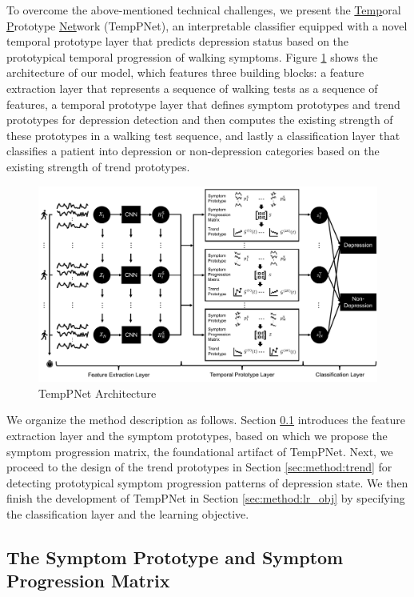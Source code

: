 \documentclass[mnsc]{informs3b} %
\begin{document}
To overcome the above-mentioned technical challenges, we present the \underline{Temp}oral \underline{P}rototype \underline{Net}work (TempPNet), an interpretable classifier equipped with a novel temporal prototype layer that predicts depression status based on the prototypical temporal progression of walking symptoms. 
Figure \ref{fig:main_model} shows the architecture of our model, which features three building blocks: a feature extraction layer that represents a sequence of walking tests as a sequence of features, a temporal prototype layer that defines symptom prototypes and trend prototypes for depression detection and then computes the existing strength of these prototypes in a walking test sequence, and lastly a classification layer that classifies a patient into depression or non-depression categories based on the existing strength of trend prototypes.
\begin{figure}[h]
    \centering
    \includegraphics[width=\textwidth]{imgs/main_model.pdf}
    \caption{TempPNet Architecture}
    \label{fig:main_model}
\end{figure}
We organize the method description as follows. 
Section \ref{sec:method:mat} introduces the feature extraction layer and the symptom prototypes, based on which we propose the symptom progression matrix, the foundational artifact of TempPNet. 
Next, we proceed to the design of the trend prototypes in Section \ref{sec:method:trend} for detecting prototypical symptom progression patterns of depression state. 
We then finish the development of TempPNet in Section \ref{sec:method:lr_obj} by specifying the classification layer and the learning objective. 

\subsection{The Symptom Prototype and Symptom Progression Matrix } \label{sec:method:mat}
\end{document}
